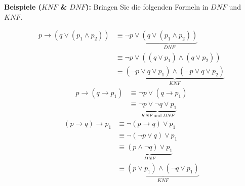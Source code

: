 \textbf{Beispiele ($KNF$ \& $DNF$):} Bringen Sie die folgenden Formeln in $DNF$ und $KNF$.
\begin{multicols}{2}
    \begin{align*}
        p \rightarrow (q \lor (p_1 \land p_2)) &\equiv \neg p \lor \underbrace{(q \lor (p_1 \land p_2))}_{DNF} \\
        &\equiv \neg p \lor ((q \lor p_1) \land (q \lor p_2)) \\
        &\equiv \underbrace{(\neg p \lor q \lor p_1) \land (\neg p \lor q \lor p_2)}_{KNF}
    \end{align*}
    \begin{align*}
        p \rightarrow (q \rightarrow p_1) &\equiv \neg p \lor (q \rightarrow p_1) \\
        &\equiv \underbrace{\neg p \lor \neg q \lor p_1}_{KNF \ \text{und} \ DNF}
    \end{align*}
    \begin{align*}
        (p \rightarrow q) \rightarrow p_1 &\equiv \neg (p \rightarrow q) \lor p_1 \\
        &\equiv \neg (\neg p \lor q) \lor p_1 \\
        &\equiv \underbrace{(p \land \neg q) \lor p_1}_{DNF} \\
        &\equiv \underbrace{(p \lor p_1) \land (\neg q \lor p_1)}_{KNF}
    \end{align*}
\end{multicols}